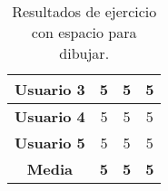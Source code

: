 \begin{table}[H]
{\begin{tabular}{l|ccc|}
            \multicolumn{1}{|l|}{\textbf{Usuario 3}} & \multicolumn{1}{c|}{5}                                                                                                                                          & \multicolumn{1}{c|}{5}                                                                                                                                                                 & 5                                                                                                                                                                                                        \\ \hline
            \multicolumn{1}{|l|}{\textbf{Usuario 4}} & \multicolumn{1}{c|}{5}                                                                                                                                          & \multicolumn{1}{c|}{5}                                                                                                                                                                 & 5                                                                                                                                                                                                        \\ \hline
            \multicolumn{1}{|l|}{\textbf{Usuario 5}} & \multicolumn{1}{c|}{5}                                                                                                                                          & \multicolumn{1}{c|}{5}                                                                                                                                                                 & 5                                                                                                                                                                                                        \\ \hline
            \multicolumn{1}{|c|}{\textbf{Media}}     & \multicolumn{1}{c|}{\textbf{5}}                                                                                                                                 & \multicolumn{1}{c|}{\textbf{5}}                                                                                                                                                        & \textbf{5}                                                                                                                                                                                               \\ \hline
        \end{tabular}
    }
    \caption{Resultados de ejercicio con espacio para dibujar.}
    \label{tab:resultadosEspacioDibujar}
\end{table}


